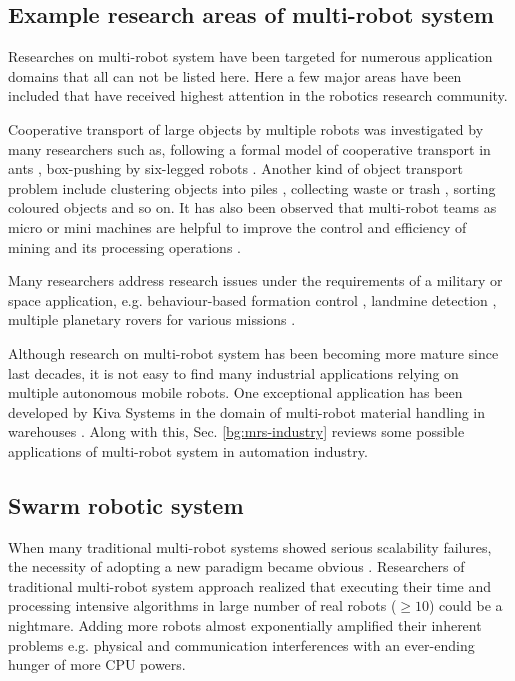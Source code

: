 \subsection*{Example research areas of multi-robot system}
\label{bg:mrs:eg}
Researches on multi-robot system have been targeted for numerous application domains that all can not be listed here. Here  a few major areas have been included that have received highest attention in the robotics research community. 

Cooperative transport of large objects  by multiple robots was investigated by many researchers such as, following a formal model of cooperative transport in ants \cite{Kube+1993}, box-pushing by six-legged robots \cite{Mataric+1995}. Another kind of object transport problem include clustering objects into piles  \cite{Beckers+1994}, collecting waste or trash \cite{Parker1994}, sorting coloured objects  \cite{Melhuish+1998} and so on. It has also been observed that multi-robot teams as micro or mini machines are helpful to improve the control and efficiency of mining and its processing operations \cite{Dunbar+2002}. 

Many researchers address research issues under the requirements of a military or space application, e.g. behaviour-based formation control \cite{Balch+1998}, landmine detection \cite{Franklin+1995}, multiple planetary rovers for various missions \cite{Huntsberger2004}.

Although research on multi-robot system has been becoming more mature since last decades, it is not easy to find many industrial applications relying on multiple autonomous mobile robots. One exceptional application has been developed by Kiva Systems in the domain of multi-robot material handling in warehouses \cite{Wurman+2008}. Along with this, Sec. \ref{bg:mrs-industry} reviews some possible applications of multi-robot system in automation industry.
\subsection{Swarm robotic system}
\label{bg:mrs:srs}
When many traditional multi-robot systems showed serious  scalability failures, the necessity of adopting a  new paradigm became obvious \cite{Lerman+2006}. Researchers of traditional multi-robot system approach realized  that  executing their time and processing intensive algorithms in large number of real robots ($\geq 10$) could be a nightmare. Adding more robots almost exponentially amplified their inherent  problems e.g. physical and communication interferences with an ever-ending hunger of more CPU powers. 

